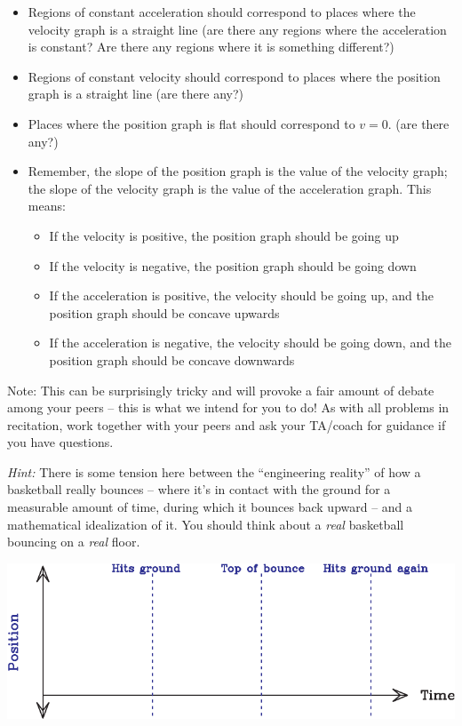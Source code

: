 \documentclass[12pt]{article}
\newcommand{\BI}{\begin{itemize}}
\newcommand{\EI}{\end{itemize}}
\def\BS{\bigskip}
\begin{document}
\begin{enumerate}
\BI
\item Regions of constant acceleration should correspond to places where the velocity graph is a straight line (are there any regions where the acceleration is constant? Are there any regions where it is something different?)
\item Regions of constant velocity should correspond to places where the position graph is a straight line (are there any?)
\item Places where the position graph is flat should correspond to $v=0$. (are there any?)
\item Remember, the slope of the position graph is the value of the velocity graph; the slope of the velocity graph is the value of the acceleration graph. This means:
\begin{itemize}
	\item If the velocity is positive, the position graph should be going up
	\item If the velocity is negative, the position graph should be going down
	\item If the acceleration is positive, the velocity should be going up, and the position graph should be concave upwards
	\item If the acceleration is negative, the velocity should be going down, and the position graph should be concave downwards
\end{itemize}
\EI


Note: This can be surprisingly tricky and will provoke a fair amount of debate among your peers -- this is what we intend for you to do! As with all problems in recitation, work together with your peers and ask your TA/coach for guidance if you have questions.

\BS\BS

{\it Hint:} There is some tension here between the ``engineering reality'' of how a basketball really bounces -- where it's in contact with the ground for a measurable amount of time, during which it bounces back upward
-- and a mathematical idealization of it. You should think about a {\it real} basketball bouncing on a {\it real} floor.

\newpage


\begin{center}
	\includegraphics[width=\textwidth]{position-crop.pdf}
	

\end{center}
\end{enumerate}
\end{document}
